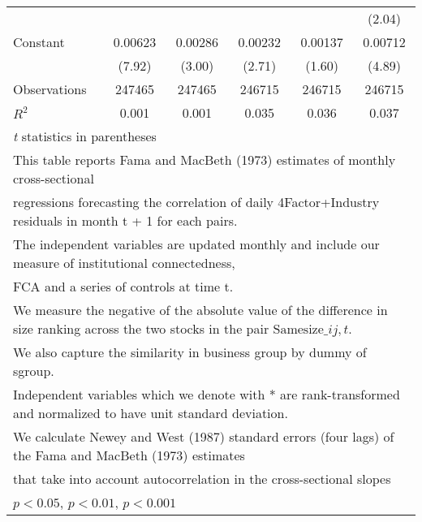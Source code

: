 {\begin{tabular}{l*{5}{c}}
                &                  &                  &                  &                  &   (2.04)         \\
[1em]
Constant        &  0.00623\sym{***}&  0.00286\sym{**} &  0.00232\sym{**} &  0.00137         &  0.00712\sym{***}\\
                &   (7.92)         &   (3.00)         &   (2.71)         &   (1.60)         &   (4.89)         \\
\hline
Observations    &   247465         &   247465         &   246715         &   246715         &   246715         \\
\(R^{2}\)       &    0.001         &    0.001         &    0.035         &    0.036         &    0.037         \\
\hline\hline
\multicolumn{6}{l}{\footnotesize \textit{t} statistics in parentheses}\\
\multicolumn{6}{l}{\footnotesize This table reports Fama and MacBeth (1973) estimates of monthly cross-sectional}\\
\multicolumn{6}{l}{\footnotesize  regressions forecasting the correlation of daily 4Factor+Industry residuals in month t + 1 for each pairs.}\\
\multicolumn{6}{l}{\footnotesize The independent variables are updated monthly and include our measure of institutional connectedness,}\\
\multicolumn{6}{l}{\footnotesize  FCA and a series of controls at time t.}\\
\multicolumn{6}{l}{\footnotesize We measure the negative of the absolute value of the difference in size ranking across the two stocks in the pair $ \text{Samesize}\_{ij,t} $.}\\
\multicolumn{6}{l}{\footnotesize We also capture the similarity in business group by dummy of sgroup.}\\
\multicolumn{6}{l}{\footnotesize Independent variables which  we denote with * are rank-transformed and normalized to have unit standard deviation.}\\
\multicolumn{6}{l}{\footnotesize  We calculate Newey and West (1987) standard errors (four lags) of the Fama and MacBeth (1973) estimates }\\
\multicolumn{6}{l}{\footnotesize  that take into account autocorrelation in the cross-sectional slopes}\\
\multicolumn{6}{l}{\footnotesize \sym{*} \(p<0.05\), \sym{**} \(p<0.01\), \sym{***} \(p<0.001\)}\\
\end{tabular}
}

